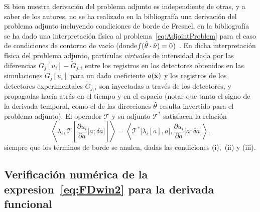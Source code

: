 Si bien nuestra derivación del problema adjunto es independiente de otras, 
y a saber de los autores, no se ha realizado en la bibliografía una derivación 
del problema adjunto incluyendo condiciones de borde de Fresnel, 
en la bibliografía se ha dado una interpretación física al 
problema~\eqref{eq:AdjointProblem} para el caso de condiciones 
de contorno de vacío (donde$f(\hat{\theta} \cdot \hat{\nu})=0$)~\cite{Dorn,Dorn2000}. 
En dicha interpretación física del problema adjunto, partículas \textit{virtuales} 
de intensidad dada por las diferencias $G_j[u_i]-\tilde {G}_{j,i} $ 
entre los registros en los detectores obtenidos en las simulaciones $G_j[u_i]$ para un 
dado coeficiente $a(\mathbf{x})$ y los registros de los detectores experimentales $\tilde {G}_{j,i}$ 
son inyectadas a través de los detectores, y propagadas hacía atrás en el tiempo 
y en el espacio (notar que tanto el signo de la derivada temporal, 
como el de las direcciones $\hat{\theta}$ resulta invertido para el problema adjunto).
El operador $\mathcal{T}$ y su adjunto $\mathcal{T}^*$ 
satisfacen la relación
\begin{equation}
\left \langle \lambda_i , 
 \mathcal{T}\left[\frac{\partial u_i}{\partial a}\big[a;\delta a\big]\right] \right \rangle=
\left \langle \mathcal{T}^* \big[\lambda_i[a],a \big] , 
 \frac{\partial u_i}{\partial a}\big[a;\delta a\big] \right \rangle.
\label{eq:RRTEdet6}
\end{equation}
siempre que los términos de borde se anulen, dadas las condiciones (i),~(ii) y (iii).
 \subsection{Verificación numérica de la expresion~\eqref{eq:FDwin2} para la derivada 
 funcional}
 \label{sec:gradcver}
 
